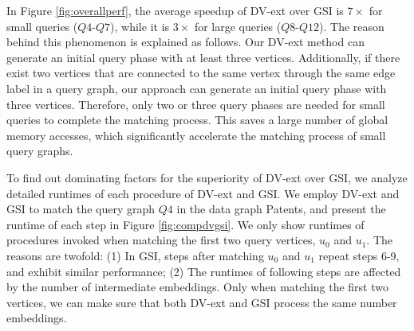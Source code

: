 In Figure \ref{fig:overallperf}, the average speedup of DV-ext over GSI is $7\times$ for small queries ($Q4$-$Q7$), while it is $3\times$ for large queries ($Q8$-$Q12$). The reason behind this phenomenon is explained as follows. Our DV-ext method can generate an initial query phase with at least three vertices. Additionally, if there exist two vertices that are connected to the same vertex through the same edge label in a query graph, our approach can generate an initial query phase with three vertices. Therefore, only two or three query phases are needed for small queries to complete the matching process. This saves a large number of global memory accesses, which significantly accelerate the matching process of small query graphs.

To find out dominating factors for the superiority of DV-ext over GSI, we analyze detailed runtimes of each procedure of DV-ext and GSI. We employ DV-ext and GSI to match the query graph $Q4$ in the data graph Patents, and present the runtime of each step in Figure \ref{fig:compdvgsi}. We only show runtimes of procedures invoked when matching the first two query vertices, $u_0$ and $u_1$. The reasons are twofold: (1) In GSI, steps after matching $u_0$ and $u_1$ repeat steps 6-9, and exhibit similar performance; (2) The runtimes of following steps are affected by the number of intermediate embeddings. Only when matching the first two vertices, we can make sure that both DV-ext and GSI process the same number embeddings.

